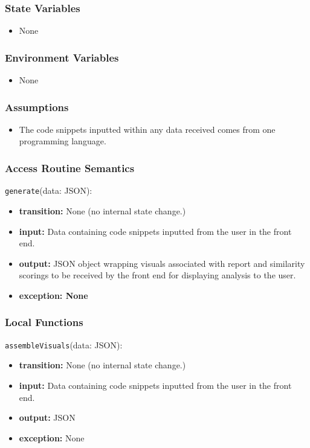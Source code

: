 \documentclass[12pt, titlepage]{article}
\begin{document}
\subsubsection{State Variables}

\begin{itemize}
    \item None
\end{itemize}

\subsubsection{Environment Variables}

\begin{itemize}
  \item None
\end{itemize}

\subsubsection{Assumptions}

\begin{itemize}
    \item The code snippets inputted within any data received comes from one programming language.
\end{itemize}

\subsubsection{Access Routine Semantics}
\noindent \texttt{generate}(data: JSON):
\begin{itemize}
    \item \textbf{transition:} None (no internal state change.)
    \item \textbf{input:} Data containing code snippets inputted from the user in the front end.
    \item \textbf{output:} JSON object wrapping visuals associated with report and 
    similarity scorings to be received by the front end for displaying analysis to the user.
    \item \textbf{exception: None}
\end{itemize}

\subsubsection{Local Functions}
\noindent \texttt{assembleVisuals}(data: JSON):
\begin{itemize}
    \item \textbf{transition:} None (no internal state change.)
    \item \textbf{input:} Data containing code snippets inputted from the user in the front end.
    \item \textbf{output:} JSON
    \item \textbf{exception:} None
\end{itemize}
\end{document}
